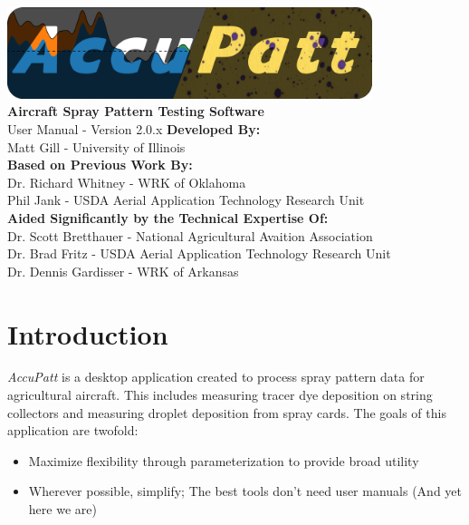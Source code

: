 \documentclass[10pt,letterpaper,titlepage]{article}
\author{Matt Gill}
\begin{document}
	\begin{titlepage}
		\begin{center}
			\vspace*{1cm}
            \includegraphics[width=0.8\textwidth]{accupatt_logo.png}\\
			\vspace{0.5cm}
			\textbf{Aircraft Spray Pattern Testing Software}\\
			User Manual - Version 2.0.x
			\vfill
			\textbf{Developed By:}\\
			Matt Gill - University of Illinois\\
            \vspace{0.5cm}
			\textbf{Based on Previous Work By:}\\
			Dr. Richard Whitney - WRK of Oklahoma\\
			Phil Jank - USDA Aerial Application Technology Research Unit\\
            \vspace{0.5cm}
			\textbf{Aided Significantly by the Technical Expertise Of:}\\
			Dr. Scott Bretthauer - National Agricultural Avaition Association\\
            Dr. Brad Fritz - USDA Aerial Application Technology Research Unit\\
            Dr. Dennis Gardisser - WRK of Arkansas\\
		\end{center}
	\end{titlepage}
	\tableofcontents
	\newpage
	
    \section{Introduction}
	\textit{AccuPatt} is a desktop application created to process spray pattern data for agricultural aircraft. This includes measuring tracer dye deposition on string collectors and measuring droplet deposition from spray cards. The goals of this application are twofold:
    \begin{itemize}
        \item Maximize flexibility through parameterization to provide broad utility
        \item Wherever possible, simplify; The best tools don't need user manuals (And yet here we are)
    \end{itemize}
\end{document}
